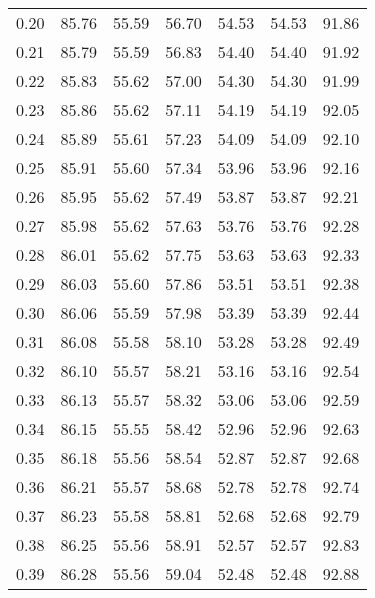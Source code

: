 \begin{tabular}{|c|c|c|c|c|c|c|}
      0.20 &     85.76 &     55.59 &      56.70 &   54.53 &      54.53 &         91.86 \\
      0.21 &     85.79 &     55.59 &      56.83 &   54.40 &      54.40 &         91.92 \\
      0.22 &     85.83 &     55.62 &      57.00 &   54.30 &      54.30 &         91.99 \\
      0.23 &     85.86 &     55.62 &      57.11 &   54.19 &      54.19 &         92.05 \\
      0.24 &     85.89 &     55.61 &      57.23 &   54.09 &      54.09 &         92.10 \\
      0.25 &     85.91 &     55.60 &      57.34 &   53.96 &      53.96 &         92.16 \\
      0.26 &     85.95 &     55.62 &      57.49 &   53.87 &      53.87 &         92.21 \\
      0.27 &     85.98 &     55.62 &      57.63 &   53.76 &      53.76 &         92.28 \\
      0.28 &     86.01 &     55.62 &      57.75 &   53.63 &      53.63 &         92.33 \\
      0.29 &     86.03 &     55.60 &      57.86 &   53.51 &      53.51 &         92.38 \\
      0.30 &     86.06 &     55.59 &      57.98 &   53.39 &      53.39 &         92.44 \\
      0.31 &     86.08 &     55.58 &      58.10 &   53.28 &      53.28 &         92.49 \\
      0.32 &     86.10 &     55.57 &      58.21 &   53.16 &      53.16 &         92.54 \\
      0.33 &     86.13 &     55.57 &      58.32 &   53.06 &      53.06 &         92.59 \\
      0.34 &     86.15 &     55.55 &      58.42 &   52.96 &      52.96 &         92.63 \\
      0.35 &     86.18 &     55.56 &      58.54 &   52.87 &      52.87 &         92.68 \\
      0.36 &     86.21 &     55.57 &      58.68 &   52.78 &      52.78 &         92.74 \\
      0.37 &     86.23 &     55.58 &      58.81 &   52.68 &      52.68 &         92.79 \\
      0.38 &     86.25 &     55.56 &      58.91 &   52.57 &      52.57 &         92.83 \\
      0.39 &     86.28 &     55.56 &      59.04 &   52.48 &      52.48 &         92.88 \\

\end{tabular}
